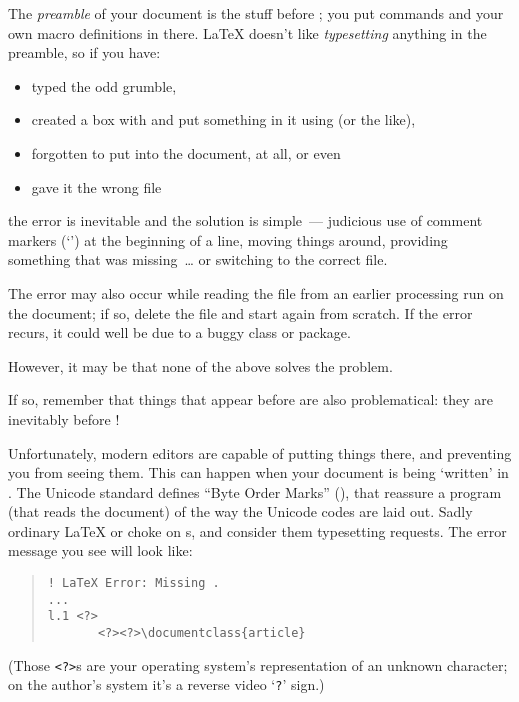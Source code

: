 {

The \emph{preamble} of your document is the stuff before
; you put  commands and
your own macro definitions in there.  \LaTeX{} doesn't like
\emph{typesetting} anything in the preamble, so if you have:
\begin{itemize}
\item typed the odd grumble,
\item created a box with  and put something in it
  using  (or the like),
\item forgotten to put  into the document,
  at all, or even
\item gave it the wrong file
\end{itemize}
the error is inevitable and the solution is simple~--- judicious use
of comment markers (`\texttt{\textpercent{}}') at the beginning of a
line, moving things around, providing something that was
missing~\dots{} or switching to the correct file.

The error may also occur while reading the  file from an
earlier processing run on the document; if so, delete the
 file and start again from scratch.  If the error
recurs, it could well be due to a buggy class or package.

However, it may be that none of the above solves the problem.

If so, remember that things that appear before  are
also problematical: they are inevitably before
!

Unfortunately, modern editors are capable of putting things there, and
preventing you from seeing them.  This can happen when your document
is being `written' in .  The Unicode
standard defines ``Byte Order Marks'' (), that reassure a
program (that reads the document) of the way the Unicode codes are
laid out.  Sadly ordinary \LaTeX{} or \pdflatex{} choke on
s, and consider them typesetting requests.  The error
message you see will look like:
\begin{quote}
\begin{verbatim}
! LaTeX Error: Missing .
...
l.1 <?>
       <?><?>\documentclass{article}
\end{verbatim}
\end{quote}
(Those \texttt{<?>}s are your operating system's representation of an
unknown character; on the author's system it's a reverse video
`\texttt{?}' sign.)

}
